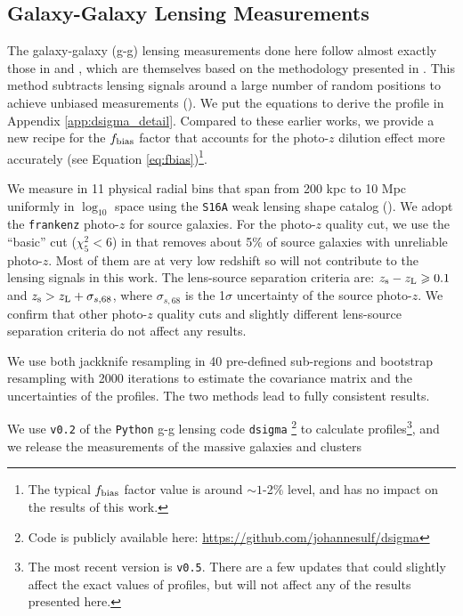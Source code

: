 \documentclass[fleqn,usenatbib,useAMS,english]{mnras}
\begin{document}
\subsection{Galaxy-Galaxy Lensing Measurements}
    \label{sec:dsigma}

    The galaxy-galaxy (g-g) lensing measurements done here follow almost exactly those in \citet{Speagle2019} and
    \citet{Huang2020}, which are themselves based on the methodology presented in \citet{Leauthaud2017}.
    This method subtracts lensing signals around a large number of random positions to achieve
    unbiased measurements (\citealt{Singh2017}).
    We put the equations to derive the \dsigma{} profile in Appendix \ref{app:dsigma_detail}.
    Compared to these earlier works, we provide a new recipe for the $f_{\rm bias}$ factor that
    accounts for the photo-$z$ dilution effect more accurately (see Equation
    \ref{eq:fbias})\footnote{The typical $f_{\rm bias}$ factor value is around $\sim 1$-2\%
    level, and has no impact on the results of this work.}.

    We measure \dsigma{} in 11 physical radial bins that span from 200 kpc to 10 Mpc uniformly
    in $\log_{10}$ space using the \texttt{S16A} weak lensing shape catalog 
    (\citealt{HSC-WLCAT, HSC-WLCALIB}).
    We adopt the \texttt{frankenz} photo-$z$ for source galaxies. 
    For the photo-$z$ quality cut, we use the ``basic'' cut ($\chi^{2}_{5} < 6$) in 
    \citet{Speagle2019} that removes about 5\% of source galaxies with unreliable photo-$z$.
    Most of them are at very low redshift so will not contribute to the lensing signals in this work.
    The lens-source separation criteria are: $z_{\rm s} - z_{\rm L} \ge 0.1$ and
    $z_{\rm s} > z_{\rm L} + \sigma_{s,68}$, where $\sigma_{s,68}$ is the 1$\sigma$ uncertainty
    of the source photo-$z$.
    We confirm that other photo-$z$ quality cuts and slightly different lens-source separation
    criteria do not affect any results.

    We use both jackknife resampling in 40 pre-defined sub-regions and bootstrap resampling
    with 2000 iterations to estimate the covariance matrix and the uncertainties of the \dsigma{}
    profiles.
    The two methods lead to fully consistent results.

    We use \texttt{v0.2} of the \texttt{Python} g-g lensing code \texttt{dsigma}
    \footnote{Code is publicly available here: \url{https://github.com/johannesulf/dsigma}} to
    calculate \dsigma{} profiles\footnote{The most recent version is \texttt{v0.5}. There are a few 
    updates that could slightly affect the exact values of \dsigma{} profiles, but will not affect 
    any of the results presented here.}, and we release the \dsigma{} measurements of the massive
    galaxies and clusters 
\end{document}
